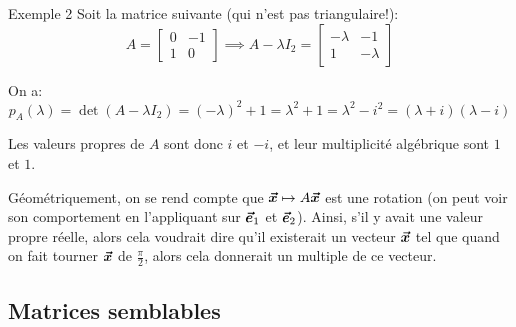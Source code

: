 \documentclass[a4paper]{article}
\begin{document}
\begin{parag}{Exemple 2}
    Soit la matrice suivante (qui n'est pas triangulaire!): 
    \[A = \begin{bmatrix} 0 & -1 \\ 1 & 0 \end{bmatrix} \implies A - \lambda I_2 = \begin{bmatrix} -\lambda & -1 \\ 1 & -\lambda \end{bmatrix} \]
    
    On a: 
    \[p_A\left(\lambda\right) = \det\left(A - \lambda I_2\right) = \left(-\lambda\right)^2 + 1 = \lambda^2 + 1 = \lambda^2 - i^2 = \left(\lambda + i\right)\left(\lambda - i\right)\]
    
    Les valeurs propres de $A$ sont donc $i$ et $-i$, et leur multiplicité algébrique sont $1$ et $1$. 

    Géométriquement, on se rend compte que $\bm{\protect\vec{x}} \mapsto A \bm{\protect\vec{x}}$ est une rotation (on peut voir son comportement en l'appliquant sur $\bm{\protect\vec{e}}_1$ et $\bm{\protect\vec{e}}_2$). Ainsi, s'il y avait une valeur propre réelle, alors cela voudrait dire qu'il existerait un vecteur $\bm{\protect\vec{x}}$ tel que quand on fait tourner $\bm{\protect\vec{x}}$ de $\frac{\pi}{2}$, alors cela donnerait un multiple de ce vecteur.

\end{parag}

\subsection{Matrices semblables}
\end{document}
